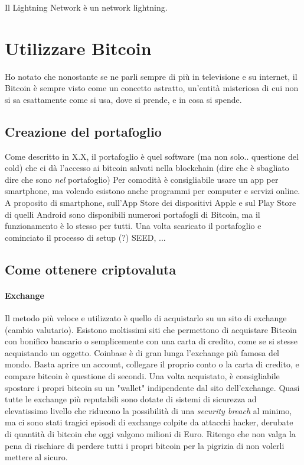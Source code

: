 \documentclass {article}
\begin{document}
Il Lightning Network è un network lightning.


\section {Utilizzare Bitcoin}


Ho notato che nonostante se ne parli sempre di più in televisione e su internet, il Bitcoin è sempre visto come un concetto astratto, un'entità misteriosa di cui non si sa esattamente come si usa, dove si prende, e in cosa si spende.


\subsection {Creazione del portafoglio}


Come descritto in X.X, il portafoglio è quel software (ma non solo.. questione del cold) che ci dà l'accesso ai bitcoin salvati nella blockchain (dire che è sbagliato dire che sono \emph{nel} portafoglio)
Per comodità è consigliabile usare un app per smartphone, ma volendo esistono anche programmi per computer e servizi online.
A proposito di smartphone, sull'App Store dei dispositivi Apple e sul Play Store di quelli Android sono disponibili numerosi portafogli di Bitcoin, ma il funzionamento è lo stesso per tutti.
Una volta scaricato il portafoglio e cominciato il processo di setup (?) SEED, ...


\subsection {Come ottenere criptovaluta}


\paragraph {Exchange}


Il metodo più veloce e utilizzato è quello di acquistarlo su un sito di exchange (cambio valutario). Esistono moltissimi siti che permettono di acquistare Bitcoin con bonifico bancario o semplicemente con una carta di credito, come se si stesse acquistando un oggetto.
Coinbase è di gran lunga l'exchange più famosa del mondo.
Basta aprire un account, collegare il proprio conto o la carta di credito, e compare bitcoin è questione di secondi.
Una volta acquistato, è consigliabile spostare i propri bitcoin su un "wallet" indipendente dal sito dell'exchange.
Quasi tutte le exchange più reputabili sono dotate di sistemi di sicurezza ad elevatissimo livello che riducono la possibilità di una \textit{security breach} al minimo, ma ci sono stati tragici episodi di exchange colpite da attacchi hacker, derubate di quantità di bitcoin che oggi valgono milioni di Euro.
Ritengo che non valga la pena di rischiare di perdere tutti i propri bitcoin per la pigrizia di non volerli mettere al sicuro.
\end{document}
